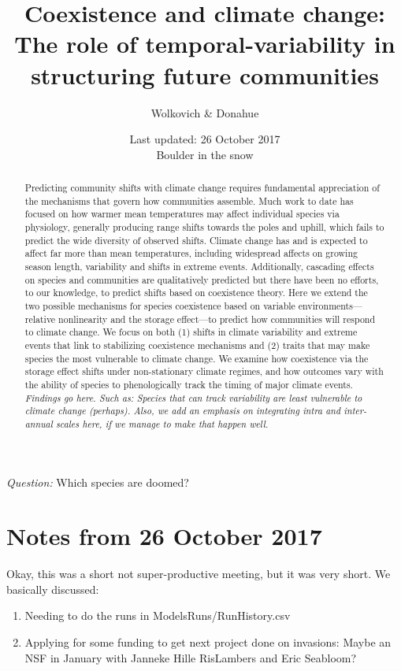 \documentclass[11pt,a4paper,oneside]{article}
\begin{document}
\renewcommand{\labelitemi}{$-$}
\title{Coexistence and climate change: \\The role of
    temporal-variability in structuring future communities}
    \author{Wolkovich \& Donahue}
\date{Last updated: 26 October 2017 \\ Boulder in the snow} %
\maketitle 

\begin{center}
\emph{Question:} Which species are doomed?
\end{center}

\begin{abstract} Predicting community shifts
with climate change requires fundamental appreciation of the
mechanisms that govern how communities assemble. Much work to date has
focused on how warmer mean temperatures may affect individual species
via physiology, generally producing range shifts towards the poles and
uphill, which fails to predict the wide diversity of observed shifts.
Climate change has and is expected to affect far more than mean
temperatures, including widespread affects on growing season
length, variability and shifts in extreme events. Additionally,
cascading effects on species and communities are qualitatively
predicted but there have been no efforts, to our knowledge, to predict
shifts based on coexistence theory. Here we extend the two possible
mechanisms for species coexistence based on variable environments---
relative nonlinearity and the storage effect---to predict how
communities will respond to climate change. We focus on both (1) shifts in
climate variability and extreme events that link to
stabilizing coexistence mechanisms and (2) traits that may
make species the most vulnerable to climate change. We examine how
coexistence via the storage effect shifts under non-stationary climate regimes, and how outcomes vary with the
ability of species to phenologically track the timing of major climate events. \emph{Findings go here. Such as: Species that can track variability are least vulnerable to climate change (perhaps).  Also, we add an emphasis on integrating intra and inter-annual scales here, if we manage to make that happen well.}
\end{abstract}

\newpage
\tableofcontents

\newpage

\section{Notes from 26 October 2017}
Okay, this was a short not super-productive meeting, but it was very short. We basically discussed:
\begin{enumerate} 
\item Needing to do the runs in ModelsRuns/RunHistory.csv
\item Applying for some funding to get next project done on invasions: Maybe an NSF in January with Janneke Hille RisLambers and Eric Seabloom?
\end{enumerate} 
\end{document}
